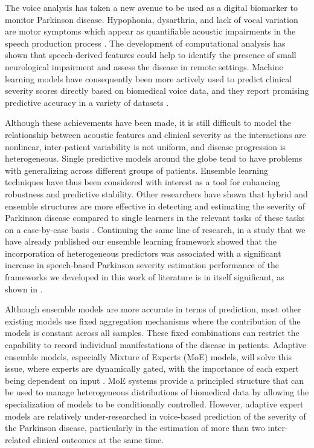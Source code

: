 \documentclass{customIEEEsingle}
\begin{document}
		The voice analysis has taken a new avenue to be used as a digital biomarker to monitor Parkinson disease. Hypophonia, dysarthria, and lack of vocal variation are motor symptoms which appear as quantifiable acoustic impairments in the speech production process \cite{little-2007, little-2008}. The development of computational analysis has shown that speech-derived features could help to identify the presence of small neurological impairment and assess the disease in remote settings. Machine learning models have consequently been more actively used to predict clinical severity scores directly based on biomedical voice data, and they report promising predictive accuracy in a variety of datasets \cite{tsanas-2009,shastry-2023,nilashi-2022,neto-2024}. 
		
		Although these achievements have been made, it is still difficult to model the relationship between acoustic features and clinical severity as the interactions are nonlinear, inter-patient variability is not uniform, and disease progression is heterogeneous. Single predictive models around the globe tend to have problems with generalizing across different groups of patients. Ensemble learning techniques have thus been considered with interest as a tool for enhancing robustness and predictive stability. Other researchers have shown that hybrid and ensemble structures are more effective in detecting and estimating the severity of Parkinson disease compared to single learners in the relevant tasks of these tasks on a case-by-case basis \cite{sheikhi-2022, motamedi-2025, khedimi-2025}. Continuing the same line of research, in a study that we have already published our ensemble learning framework showed that the incorporation of heterogeneous predictors was associated with a significant increase in speech-based Parkinson severity estimation performance of the frameworks we developed in this work of literature is in itself significant, as shown in \cite{dasgupta-2025}. 
		
		Although ensemble models are more accurate in terms of prediction, most other existing models use fixed aggregation mechanisms where the contribution of the models is constant across all samples. These fixed combinations can restrict the capability to record individual manifestations of the disease in patients. Adaptive ensemble models, especially Mixture of Experts (MoE) models, will solve this issue, where experts are dynamically gated, with the importance of each expert being dependent on input \cite{khalili-2013, raza-2025}. MoE systems provide a principled structure that can be used to manage heterogeneous distributions of biomedical data by allowing the specialization of models to be conditionally controlled. However, adaptive expert models are relatively under-researched in voice-based prediction of the severity of the Parkinson disease, particularly in the estimation of more than two inter-related clinical outcomes at the same time. 
		
\end{document}
